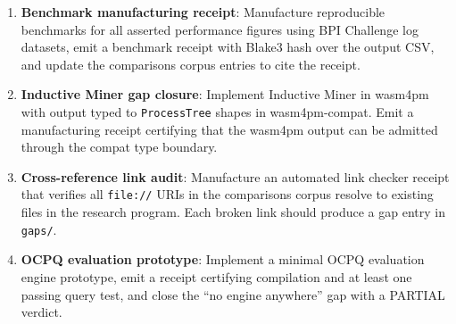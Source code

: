 \begin{enumerate}
  \item \textbf{Benchmark manufacturing receipt}: Manufacture reproducible
    benchmarks for all asserted performance figures using BPI Challenge log
    datasets, emit a benchmark receipt with Blake3 hash over the output CSV,
    and update the comparisons corpus entries to cite the receipt.
  \item \textbf{Inductive Miner gap closure}: Implement Inductive Miner in
    wasm4pm with output typed to \texttt{ProcessTree} shapes in wasm4pm-compat.
    Emit a manufacturing receipt certifying that the wasm4pm output can be
    admitted through the compat type boundary.
  \item \textbf{Cross-reference link audit}: Manufacture an automated link
    checker receipt that verifies all \texttt{file://} URIs in the comparisons
    corpus resolve to existing files in the research program. Each broken link
    should produce a gap entry in \texttt{gaps/}.
  \item \textbf{OCPQ evaluation prototype}: Implement a minimal OCPQ evaluation
    engine prototype, emit a receipt certifying compilation and at least one
    passing query test, and close the ``no engine anywhere'' gap with a
    PARTIAL verdict.
\end{enumerate}
